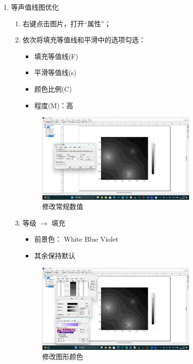 \begin{enumerate}
    \item 等声值线图优化
    \begin{enumerate}[label=\arabic*)]
        \item 右键点击图片，打开“属性”；
        \item 依次将填充等值线和平滑中的选项勾选：
        \begin{itemize}
            \item 填充等值线(F)
            \item 平滑等值线(s)
            \item 颜色比例(C)
            \item 程度(M)：高
        \end{itemize}
        \begin{figure}[H]
            \centering
            \includegraphics[width=0.8\textwidth]{figures/Sufer_step3-1.png}
            \caption{修改常规数值}
        \end{figure}

        \item 等级 $\rightarrow $ 填充
        \begin{itemize}
            \item 前景色： White  Blue Violet 
            \item 其余保持默认
        \end{itemize}
        \begin{figure}[H]
            \centering
            \includegraphics[width=0.8\textwidth]{figures/Sufer_step3-2.png}
            \caption{修改图形颜色}
        \end{figure}


\end{enumerate}
\end{enumerate}
